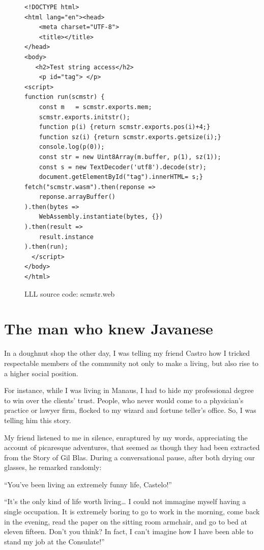 \documentclass[a4paper,12pt]{book}
\begin{document}
\begin{figure}[!h]
\begin{verbatim}
<!DOCTYPE html>
<html lang="en"><head>
    <meta charset="UTF-8">
    <title></title>
</head>
<body>
   <h2>Test string access</h2>
    <p id="tag"> </p>
<script>
function run(scmstr) {
    const m   = scmstr.exports.mem;
    scmstr.exports.initstr();
    function p(i) {return scmstr.exports.pos(i)+4;}
    function sz(i) {return scmstr.exports.getsize(i);}
    console.log(p(0));
    const str = new Uint8Array(m.buffer, p(1), sz(1));
    const s = new TextDecoder('utf8').decode(str);
    document.getElementById("tag").innerHTML= s;}
fetch("scmstr.wasm").then(reponse =>
    reponse.arrayBuffer()
).then(bytes =>
    WebAssembly.instantiate(bytes, {})
).then(result =>
    result.instance
).then(run);
  </script>
</body>
</html>
\end{verbatim}
\caption{LLL source code: scmstr.web}
\label{wasm:scmstr.html}  
\end{figure}




\chapter{The man who knew Javanese}
In a doughnut shop the other day,
I was telling my friend Castro
how I tricked respectable members of the
community not only to make a living,
but also rise to a higher social position.

For instance, while I was living in Manaus,
I had to hide my professional degree to win
over the clients' trust. People, who never would
come to a physician's practice or lawyer firm,
flocked to my wizard and fortune teller's office.
So, I was telling him this story.

My friend listened to me in silence,
enraptured by my words,
appreciating the account of picaresque adventures,
that seemed as though they had been
extracted from the Story of Gil Blas.
During a conversational pause,
after both drying our glasses,
he remarked randomly:

``You've been living an extremely funny life, Castelo!''

``It's the only kind of life worth living\ldots
I could not immagine
myself having a single occupation.
It is extremely boring
to go to work in the morning,
come back in the evening, read the paper
on the sitting room armchair,
and go to bed at eleven fifteen.
Don't you think?
In fact, I can't imagine how I have been
able to stand my job at the Consulate!''
\end{document}
